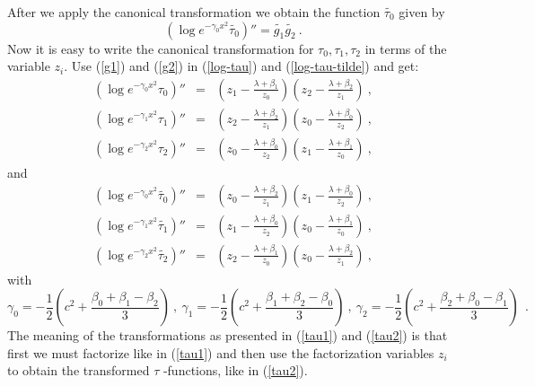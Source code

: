 \documentclass[a4paper,11pt]{article}
\begin{document}
After we apply the canonical transformation we obtain the function $\tilde{\tau_0}$
given by
\begin{equation}
\label{log-tau-tilde}
\left( \log e^{-\gamma_0 x^2} \tilde{\tau_0} \right)'' =
\tilde{g_1} \tilde{g_2} ~.
\end{equation}
Now it is easy to write the canonical transformation for $\tau_0, \tau_1, \tau_2$ in
terms of the variable $z_i$. Use (\ref{g1}) and (\ref{g2}) in (\ref{log-tau}) and
(\ref{log-tau-tilde}) and get:
\begin{eqnarray}
\label{tau1}
\left( \log e^{-\gamma_0 x^2} \tau_0 \right)'' \!\!\!&=&\!\!\!
\left(z_1-\frac{\lambda+\beta_1}{z_0} \right)\left(z_2-\frac{\lambda+\beta_2}{z_1}\right)~,
\nonumber \\
\left( \log e^{-\gamma_1 x^2} \tau_1 \right)'' \!\!\!&=&\!\!\!
\left(z_2-\frac{\lambda+\beta_2}{z_1} \right)\left(z_0-\frac{\lambda+\beta_0}{z_2}\right)~,\\
\left( \log e^{-\gamma_2 x^2} \tau_2 \right)'' \!\!\!&=&\!\!\!
\left(z_0-\frac{\lambda+\beta_0}{z_2} \right)\left(z_1-\frac{\lambda+\beta_1}{z_0}\right)~,
\nonumber
\end{eqnarray}
and
\begin{eqnarray}
\label{tau2}
\left( \log e^{-\gamma_0 x^2} \tilde{\tau_0} \right)'' \!\!\!&=&\!\!\!
\left(z_0-\frac{\lambda+\beta_2}{z_1} \right)\left(z_1-\frac{\lambda+\beta_0}{z_2}\right)~,
\nonumber \\
\left( \log e^{-\gamma_1 x^2} \tilde{\tau_1} \right)'' \!\!\!&=&\!\!\!
\left(z_1-\frac{\lambda+\beta_0}{z_2} \right)\left(z_0-\frac{\lambda+\beta_1}{z_0}\right)~, \\
\left( \log e^{-\gamma_2 x^2} \tilde{\tau_2} \right)'' \!\!\!&=&\!\!\!
\left(z_2-\frac{\lambda+\beta_1}{z_0} \right)\left(z_0-\frac{\lambda+\beta_2}{z_1}\right)~,
\nonumber
\end{eqnarray}
with
$$
\gamma_0 = -\frac{1}{2} \left(c^2 + \frac{\beta_0 +\beta_1 -\beta_2}{3}\right)~,~
\gamma_1 = -\frac{1}{2} \left(c^2 + \frac{\beta_1 +\beta_2 -\beta_0}{3}\right)~,~
\gamma_2 = -\frac{1}{2} \left(c^2 + \frac{\beta_2 +\beta_0 -\beta_1}{3}\right)~~.
$$
The meaning of the transformations as presented in (\ref{tau1}) and (\ref{tau2}) is that
first we must factorize like in (\ref{tau1}) and then use the factorization variables
$z_i$ to obtain the transformed $\tau$ -functions, like in (\ref{tau2}).
\end{document}
